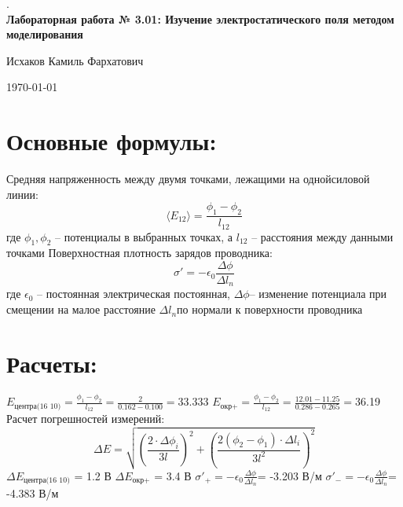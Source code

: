 \documentclass{article}%
\begin{document}
%
\normalsize%
\begin{center}%
.\\%
\vspace{12cm}%
\textbf{Лабораторная работа № 3.01: Изучение электростатического поля методом моделирования}%
\end{center}%
\begin{center}%
Исхаков Камиль Фархатович%
\end{center}%
\begin{center}%
\today%
\end{center}%
\newpage%
\section{Основные формулы:}%
\label{sec:}%

%
Средняя напряженность между двумя точками, лежащими на однойсиловой линии:\begin{displaymath}\langle E_{12} \rangle= \frac{\phi_1-\phi_2}{l_{12}}\end{displaymath}%
\newline%
где $\phi_1, \phi_2$ – потенциалы в выбранных точках, а $l_{12}$ – расстояния между данными точками%
\newline%
Поверхностная плотность зарядов проводника:\begin{displaymath}\sigma' = -\epsilon_0 \frac{\Delta \phi}{\Delta l_n}\end{displaymath}%
\newline%
где $\epsilon_0$ – постоянная электрическая постоянная, $\Delta \phi$– изменение потенциала при смещении на малое расстояние $\Delta l_n$по нормали к поверхности проводника%
\newline%
\section{Расчеты:}%
\label{sec:}%

%
$E_{\text{центра(16 10)}} = \frac{\phi_1-\phi_2}{l_{12}} = \frac{2}{0.162-0.100} = $33.333%
\newline%
$E_{\text{окр+}} = \frac{\phi_1-\phi_2}{l_{12}} = \frac{12.01-11.25}{0.286-0.265} = $36.19%
\newline%
Расчет погрешностей измерений:\begin{displaymath}\Delta E = \sqrt{\left(\frac{2\cdot \Delta \phi_i}{3 l}\right)^2+\left(\frac{2(\phi_2-\phi_1)\cdot \Delta l_i}{3 l^2}\right)^2}\end{displaymath}%
\newline%
$\Delta E_{\text{центра(16 10)}}$ = 1.2 В%
\newline%
$\Delta E_{\text{окр+}}$ = 3.4 В%
\newline%
$\sigma'_{+} = - \epsilon_0 \frac{\Delta \phi}{\Delta l_n} $= -3.203 В/м%
\newline%
$\sigma'_{-} = - \epsilon_0 \frac{\Delta \phi}{\Delta l_n} $= -4.383 В/м%
\newline%
\end{document}
